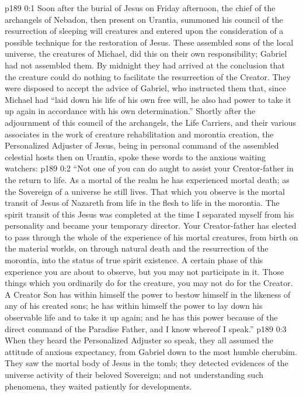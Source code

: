 \author{Midwayer Commission}
\vs p189 0:1 Soon after the burial of Jesus on Friday afternoon, the chief of the archangels of Nebadon, then present on Urantia, summoned his council of the resurrection of sleeping will creatures and entered upon the consideration of a possible technique for the restoration of Jesus. These assembled sons of the local universe, the creatures of Michael, did this on their own responsibility; Gabriel had not assembled them. By midnight they had arrived at the conclusion that the creature could do nothing to facilitate the resurrection of the Creator. They were disposed to accept the advice of Gabriel, who instructed them that, since Michael had “laid down his life of his own free will, he also had power to take it up again in accordance with his own determination.” Shortly after the adjournment of this council of the archangels, the Life Carriers, and their various associates in the work of creature rehabilitation and morontia creation, the Personalized Adjuster of Jesus, being in personal command of the assembled celestial hosts then on Urantia, spoke these words to the anxious waiting watchers:
\vs p189 0:2 “Not one of you can do aught to assist your Creator\hyp{}father in the return to life. As a mortal of the realm he has experienced mortal death; as the Sovereign of a universe he still lives. That which you observe is the mortal transit of Jesus of Nazareth from life in the flesh to life in the morontia. The spirit transit of this Jesus was completed at the time I separated myself from his personality and became your temporary director. Your Creator\hyp{}father has elected to pass through the whole of the experience of his mortal creatures, from birth on the material worlds, on through natural death and the resurrection of the morontia, into the status of true spirit existence. A certain phase of this experience you are about to observe, but you may not participate in it. Those things which you ordinarily do for the creature, you may not do for the Creator. A Creator Son has within himself the power to bestow himself in the likeness of any of his created sons; he has within himself the power to lay down his observable life and to take it up again; and he has this power because of the direct command of the Paradise Father, and I know whereof I speak.”
\vs p189 0:3 When they heard the Personalized Adjuster so speak, they all assumed the attitude of anxious expectancy, from Gabriel down to the most humble cherubim. They saw the mortal body of Jesus in the tomb; they detected evidences of the universe activity of their beloved Sovereign; and not understanding such phenomena, they waited patiently for developments.
